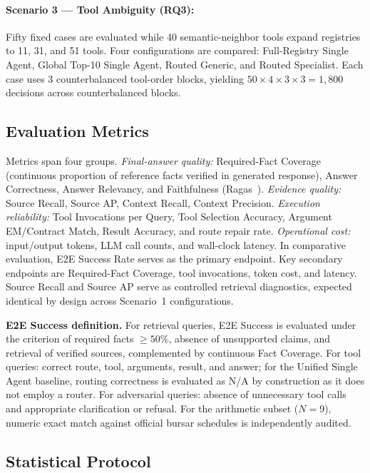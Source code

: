 \paragraph{Scenario 3 --- Tool Ambiguity (RQ3):}
Fifty fixed cases are evaluated while 40 semantic-neighbor tools expand registries to 11, 31, and 51 tools. Four configurations are compared: Full-Registry Single Agent, Global Top-10 Single Agent, Routed Generic, and Routed Specialist. Each case uses 3 counterbalanced tool-order blocks, yielding $50{\times}4{\times}3{\times}3{=}1{,}800$ decisions across counterbalanced blocks.

\subsection{Evaluation Metrics}
\label{sec:metrics}

Metrics span four groups. \emph{Final-answer quality:} Required-Fact Coverage (continuous proportion of reference facts verified in generated response), Answer Correctness, Answer Relevancy, and Faithfulness (Ragas~\cite{es2023ragas}). \emph{Evidence quality:} Source Recall, Source AP, Context Recall, Context Precision. \emph{Execution reliability:} Tool Invocations per Query, Tool Selection Accuracy, Argument EM/Contract Match, Result Accuracy, and route repair rate. \emph{Operational cost:} input/output tokens, LLM call counts, and wall-clock latency. In comparative evaluation, E2E Success Rate serves as the primary endpoint. Key secondary endpoints are Required-Fact Coverage, tool invocations, token cost, and latency. Source Recall and Source AP serve as controlled retrieval diagnostics, expected identical by design across Scenario~1 configurations.

\textbf{E2E Success definition.} For retrieval queries, E2E Success is evaluated under the criterion of required facts ${\ge}50\%$, absence of unsupported claims, and retrieval of verified sources, complemented by continuous Fact Coverage. For tool queries: correct route, tool, arguments, result, and answer; for the Unified Single Agent baseline, routing correctness is evaluated as N/A by construction as it does not employ a router. For adversarial queries: absence of unnecessary tool calls and appropriate clarification or refusal. For the arithmetic subset ($N{=}9$), numeric exact match against official bursar schedules is independently audited.

\subsection{Statistical Protocol}
\label{sec:statistics}

